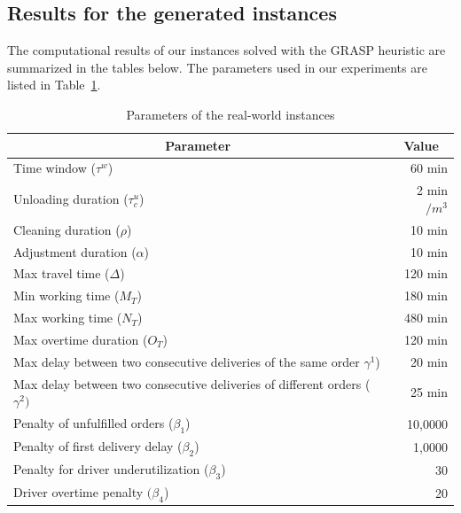 \subsection{Results for the generated instances}

The computational results of our instances solved with the GRASP heuristic are summarized in the tables below. %
The parameters used in our experiments are listed in Table~\ref{tab:cdp_problem_parameters}.

\begin{table}[hbt]
    \centering
    \caption{Parameters of the real-world instances}
    \label{tab:cdp_problem_parameters}
    \small
    \begin{tabularx}{\textwidth}{Xr}
        \toprule
        \multicolumn{1}{c}{Parameter}  &
        \multicolumn{1}{c}{Value} \\ \midrule
 Time window ($\tau^w$)  & 60 min    \\
 Unloading duration ($\tau_c^u$)  & 2 min$/m^3$   \\
 Cleaning duration ($\rho$)    & 10 min  \\
        Adjustment duration ($\alpha$)                                                & 10 min                    \\
        Max travel time ($\Delta$)                                                    & 120 min                   \\
        Min working time ($M_T$)                                                      & 180 min                   \\
        Max working time ($N_T$)                                                      & 480 min                   \\
        Max overtime duration ($O_T$)                                                 & 120 min                   \\
        Max delay between two consecutive deliveries of the same order $\gamma^1$)   & 20 min                    \\
        Max delay between two consecutive deliveries of different orders ($\gamma^2)$ & 25 min                    \\
        Penalty of unfulfilled orders ($\beta_1$)                                     & 10,0000                   \\
        Penalty of first delivery delay ($\beta_2$)                                   & 1,0000                    \\
        Penalty for driver underutilization  ($\beta_3$)                              & 30                        \\
        Driver overtime penalty $ (\beta_4$)                                          & 20                        \\
        \bottomrule
    \end{tabularx}
\end{table}

